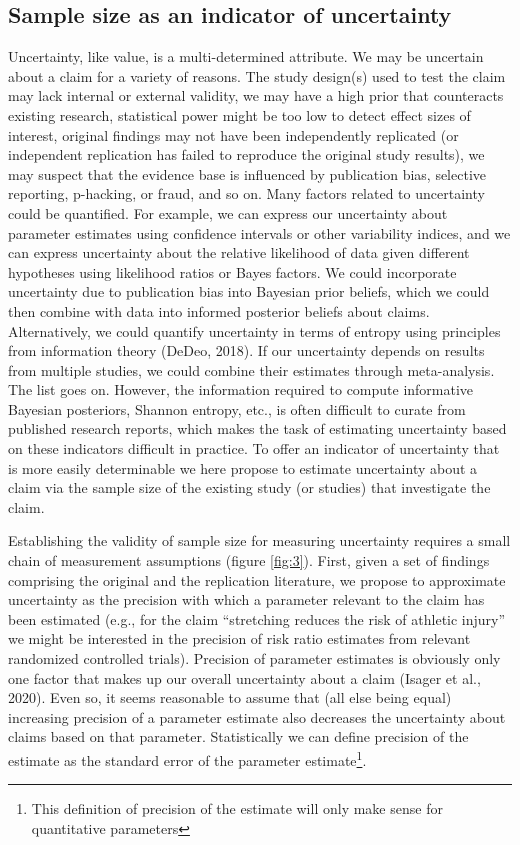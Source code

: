 \documentclass[
  english,
  man,floatsintext]{apa6}
\begin{document}
\hypertarget{sample-size-as-an-indicator-of-uncertainty}{%
\subsection{Sample size as an indicator of uncertainty}\label{sample-size-as-an-indicator-of-uncertainty}}

Uncertainty, like value, is a multi-determined attribute. We may be uncertain about a claim for a variety of reasons. The study design(s) used to test the claim may lack internal or external validity, we may have a high prior that counteracts existing research, statistical power might be too low to detect effect sizes of interest, original findings may not have been independently replicated (or independent replication has failed to reproduce the original study results), we may suspect that the evidence base is influenced by publication bias, selective reporting, p-hacking, or fraud, and so on. Many factors related to uncertainty could be quantified. For example, we can express our uncertainty about parameter estimates using confidence intervals or other variability indices, and we can express uncertainty about the relative likelihood of data given different hypotheses using likelihood ratios or Bayes factors. We could incorporate uncertainty due to publication bias into Bayesian prior beliefs, which we could then combine with data into informed posterior beliefs about claims. Alternatively, we could quantify uncertainty in terms of entropy using principles from information theory (DeDeo, 2018). If our uncertainty depends on results from multiple studies, we could combine their estimates through meta-analysis. The list goes on. However, the information required to compute informative Bayesian posteriors, Shannon entropy, etc., is often difficult to curate from published research reports, which makes the task of estimating uncertainty based on these indicators difficult in practice. To offer an indicator of uncertainty that is more easily determinable we here propose to estimate uncertainty about a claim via the sample size of the existing study (or studies) that investigate the claim.

Establishing the validity of sample size for measuring uncertainty requires a small chain of measurement assumptions (figure \ref{fig:3}). First, given a set of findings comprising the original and the replication literature, we propose to approximate uncertainty as the precision with which a parameter relevant to the claim has been estimated (e.g., for the claim ``stretching reduces the risk of athletic injury'' we might be interested in the precision of risk ratio estimates from relevant randomized controlled trials). Precision of parameter estimates is obviously only one factor that makes up our overall uncertainty about a claim (Isager et al., 2020). Even so, it seems reasonable to assume that (all else being equal) increasing precision of a parameter estimate also decreases the uncertainty about claims based on that parameter. Statistically we can define precision of the estimate as the standard error of the parameter estimate\footnote{This definition of precision of the estimate will only make sense for quantitative parameters}.
\end{document}

